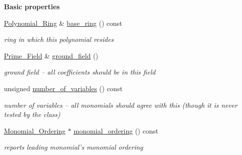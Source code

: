 \begin{Indent}\textbf{ Basic properties}\par
\begin{DoxyCompactItemize}
\item 
\mbox{\label{class_abstract___polynomial_abf1f531c0004bf37874e98eee42dc0f4}} 
\hyperlink{class_polynomial___ring}{Polynomial\+\_\+\+Ring} \& \hyperlink{class_abstract___polynomial_abf1f531c0004bf37874e98eee42dc0f4}{base\+\_\+ring} () const
\begin{DoxyCompactList}\small\item\em ring in which this polynomial resides \end{DoxyCompactList}\item 
\mbox{\label{class_abstract___polynomial_a5bd4f2c1ef7a4f090afd6cd55bc2604f}} 
\hyperlink{class_prime___field}{Prime\+\_\+\+Field} \& \hyperlink{class_abstract___polynomial_a5bd4f2c1ef7a4f090afd6cd55bc2604f}{ground\+\_\+field} ()
\begin{DoxyCompactList}\small\item\em ground field -- all coefficients should be in this field \end{DoxyCompactList}\item 
\mbox{\label{class_abstract___polynomial_a4419bbe47e14683f2903c47bee8e04af}} 
unsigned \hyperlink{class_abstract___polynomial_a4419bbe47e14683f2903c47bee8e04af}{number\+\_\+of\+\_\+variables} () const
\begin{DoxyCompactList}\small\item\em number of variables -- all monomials should agree with this (though it is never tested by the class) \end{DoxyCompactList}\item 
\mbox{\label{class_abstract___polynomial_a2ee0bd5e71ec7f946c53d61d2b07325e}} 
\hyperlink{class_monomial___ordering}{Monomial\+\_\+\+Ordering} $\ast$ \hyperlink{class_abstract___polynomial_a2ee0bd5e71ec7f946c53d61d2b07325e}{monomial\+\_\+ordering} () const
\begin{DoxyCompactList}\small\item\em reports leading monomial's monomial ordering \end{DoxyCompactList}\item 

\end{DoxyCompactItemize}
\end{Indent}
